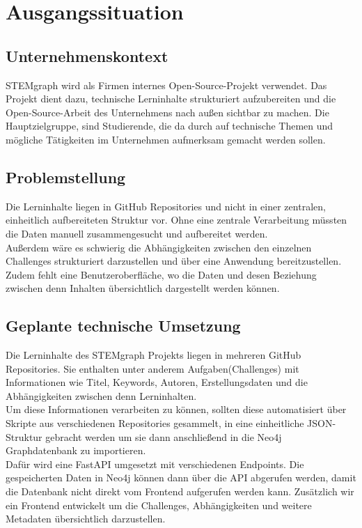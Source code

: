 \section{Ausgangssituation}

\subsection{Unternehmenskontext}

STEMgraph wird als Firmen internes Open-Source-Projekt verwendet. Das Projekt dient dazu, technische Lerninhalte strukturiert aufzubereiten und die Open-Source-Arbeit des Unternehmens nach außen sichtbar zu machen. 
Die Hauptzielgruppe, sind Studierende, die da durch auf technische Themen und mögliche Tätigkeiten im Unternehmen aufmerksam gemacht werden sollen.

\subsection{Problemstellung}

Die Lerninhalte liegen in GitHub Repositories und nicht in einer zentralen, einheitlich aufbereiteten Struktur vor.
Ohne eine zentrale Verarbeitung müssten die Daten manuell zusammengesucht und aufbereitet werden.
\\
Außerdem wäre es schwierig die Abhängigkeiten zwischen den einzelnen Challenges strukturiert darzustellen und über eine Anwendung bereitzustellen.
\\
Zudem fehlt eine Benutzeroberfläche, wo die Daten und desen Beziehung zwischen denn Inhalten übersichtlich dargestellt werden können.

\subsection{Geplante technische Umsetzung}

Die Lerninhalte des STEMgraph Projekts liegen in mehreren GitHub Repositories.
Sie enthalten unter anderem Aufgaben(Challenges) mit Informationen wie Titel, Keywords, Autoren, Erstellungsdaten und die Abhängigkeiten zwischen denn Lerninhalten.
\\
Um diese Informationen verarbeiten zu können, sollten diese automatisiert über Skripte aus verschiedenen Repositories gesammelt, in eine einheitliche JSON-Struktur gebracht werden um sie dann anschließend in die Neo4j Graphdatenbank zu importieren.
\\
Dafür wird eine FastAPI umgesetzt mit verschiedenen Endpoints.
Die gespeicherten Daten in Neo4j können dann über die API abgerufen werden, damit die Datenbank nicht direkt vom Frontend aufgerufen werden kann.
Zusätzlich wir ein Frontend entwickelt um die Challenges, Abhängigkeiten und weitere Metadaten übersichtlich darzustellen.